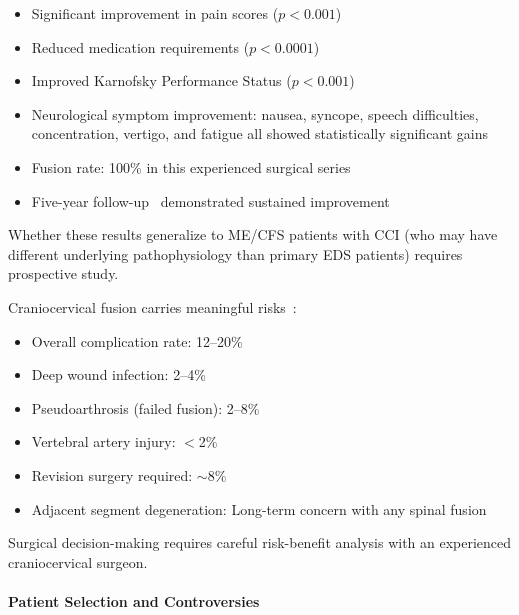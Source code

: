 \begin{itemize}
    \item Significant improvement in pain scores ($p<0.001$)
    \item Reduced medication requirements ($p<0.0001$)
    \item Improved Karnofsky Performance Status ($p<0.001$)
    \item Neurological symptom improvement: nausea, syncope, speech difficulties, concentration, vertigo, and fatigue all showed statistically significant gains
    \item Fusion rate: 100\% in this experienced surgical series
    \item Five-year follow-up~\cite{Henderson2018} demonstrated sustained improvement
\end{itemize}

Whether these results generalize to ME/CFS patients with CCI (who may have different underlying pathophysiology than primary EDS patients) requires prospective study.

\begin{warning}
\label{warn:cci-surgery-complications}
Craniocervical fusion carries meaningful risks~\cite{Lohkamp2022}:
\begin{itemize}
    \item Overall complication rate: 12--20\%
    \item Deep wound infection: 2--4\%
    \item Pseudoarthrosis (failed fusion): 2--8\%
    \item Vertebral artery injury: $<$2\%
    \item Revision surgery required: $\sim$8\%
    \item Adjacent segment degeneration: Long-term concern with any spinal fusion
\end{itemize}
Surgical decision-making requires careful risk-benefit analysis with an experienced craniocervical surgeon.
\end{warning}

\paragraph{Patient Selection and Controversies}

